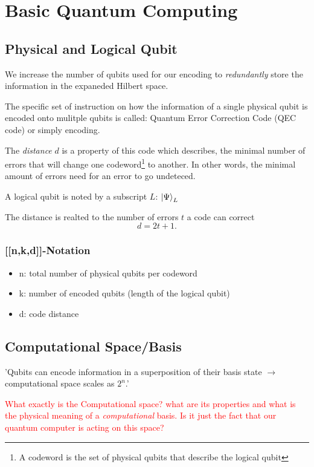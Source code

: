 \section{Basic Quantum Computing}

\subsection{Physical and Logical Qubit}

We increase the number of qubits used for our encoding to \textit{redundantly} store the information in the expaneded Hilbert space.

The specific set of instruction on how the information of a single physical 
qubit is encoded onto mulitple qubits is called:
Quantum Error Correction Code (QEC code) or simply encoding.

The \textit{distance} $d$ is a property of this code which describes, 
the minimal number of errors that will change one 
codeword\footnote{A codeword is the set of physical qubits that describe the logical qubit} to another.
In other words, the minimal amount of errors need for an error to go undeteced.

A logical qubit is noted by a subscript $L$: $\ket{\Psi}_L$

The distance is realted to the number of errors $t$ a code can correct
\begin{equation}
    d = 2t+1.
\end{equation}

\subsubsection{[[n,k,d]]-Notation}
\begin{itemize}
    \item n: total number of physical qubits per codeword
    \item k: number of encoded qubits (length of the logical qubit)
    \item d: code distance
\end{itemize}
 
\subsection{Computational Space/Basis}

'Qubits can encode information in a superposition of their basis state $\rightarrow$ computational space scales as $2^n$.'

\textcolor{red}{What exactly is the Computational space? what are its properties and what is the physical meaning of a \textit{computational} basis. 
Is it just the fact that our quantum computer is acting on this space?}


